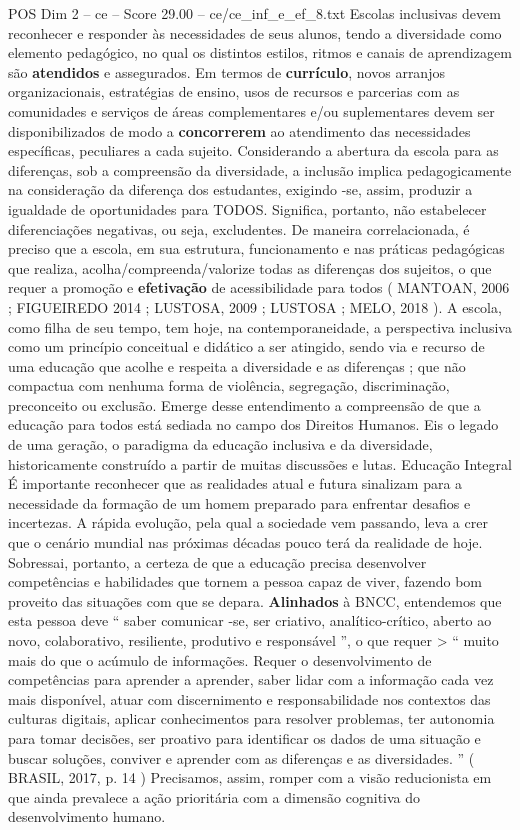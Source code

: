 \begin{textsample}{POS Dim 2 – ce – Score 29.00 – ce/ce\_inf\_e\_ef\_8.txt}
Escolas inclusivas devem reconhecer e responder às necessidades de seus alunos, tendo a diversidade como elemento pedagógico, no qual os distintos estilos, ritmos e canais de aprendizagem são \textbf{atendidos} e assegurados.
Em termos de \textbf{currículo}, novos arranjos organizacionais, estratégias de ensino, usos de recursos e parcerias com as comunidades e serviços de áreas complementares e/ou suplementares devem ser disponibilizados de modo a \textbf{concorrerem} ao atendimento das necessidades específicas, peculiares a cada sujeito.
Considerando a abertura da escola para as diferenças, sob a compreensão da diversidade, a inclusão implica pedagogicamente na consideração da diferença dos estudantes, exigindo -se, assim, produzir a igualdade de oportunidades para TODOS.
Significa, portanto, não estabelecer diferenciações negativas, ou seja, excludentes.
De maneira correlacionada, é preciso que a escola, em sua estrutura, funcionamento e nas práticas pedagógicas que realiza, acolha/compreenda/valorize todas as diferenças dos sujeitos, o que requer a promoção e \textbf{efetivação} de acessibilidade para todos ( MANTOAN, 2006 ; FIGUEIREDO 2014 ; LUSTOSA, 2009 ; LUSTOSA ; MELO, 2018 ).
A escola, como filha de seu tempo, tem hoje, na contemporaneidade, a perspectiva inclusiva como um princípio conceitual e didático a ser atingido, sendo via e recurso de uma educação que acolhe e respeita a diversidade e as diferenças ; que não compactua com nenhuma forma de violência, segregação, discriminação, preconceito ou exclusão.
Emerge desse entendimento a compreensão de que a educação para todos está sediada no campo dos Direitos Humanos.
Eis o legado de uma geração, o paradigma da educação inclusiva e da diversidade, historicamente construído a partir de muitas discussões e lutas.
Educação Integral É importante reconhecer que as realidades atual e futura sinalizam para a necessidade da formação de um homem preparado para enfrentar desafios e incertezas.
A rápida evolução, pela qual a sociedade vem passando, leva a crer que o cenário mundial nas próximas décadas pouco terá da realidade de hoje.
Sobressai, portanto, a certeza de que a educação precisa desenvolver competências e habilidades que tornem a pessoa capaz de viver, fazendo bom proveito das situações com que se depara. \textbf{Alinhados} à BNCC, entendemos que esta pessoa deve “ saber comunicar -se, ser criativo, analítico-crítico, aberto ao novo, colaborativo, resiliente, produtivo e responsável ”, o que requer > “ muito mais do que o acúmulo de informações.
Requer o desenvolvimento de competências para aprender a aprender, saber lidar com a informação cada vez mais disponível, atuar com discernimento e responsabilidade nos contextos das culturas digitais, aplicar conhecimentos para resolver problemas, ter autonomia para tomar decisões, ser proativo para identificar os dados de uma situação e buscar soluções, conviver e aprender com as diferenças e as diversidades. ” ( BRASIL, 2017, p. 14 ) Precisamos, assim, romper com a visão reducionista em que ainda prevalece a ação prioritária com a dimensão cognitiva do desenvolvimento humano.

\end{textsample}
